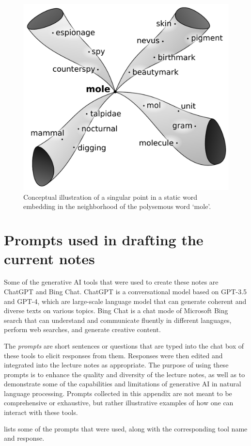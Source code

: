 \documentclass[11pt, a4paper]{amsart}
\newcommand{\generatedtext}[1]{\colorbox{light-gray}{{#1}}} %
\begin{document}
\begin{figure}
	\centering
	\includegraphics[width=0.35\linewidth]{figures/topological_data_analysis/TPS_paper_screenshot}
	\caption{
		Conceptual illustration of a singular point in a static word embedding in the neighborhood of the polysemous word `mole'.
		\label{fig:TPS_paper_screenshot}
	}
\end{figure}


\newpage
\printbibliography


\newpage
\appendix


\section{Prompts used in drafting the current notes}
\label{appendix:prompts}

Some of the generative AI tools that were used to create these notes are ChatGPT and Bing Chat.
ChatGPT is a conversational model based on GPT-3.5 and GPT-4, which are large-scale language model that can generate coherent and diverse texts on various topics.
Bing Chat is a chat mode of Microsoft Bing search that can understand and communicate fluently in different languages, perform web searches, and generate creative content.

The \emph{prompts} are short sentences or questions that are typed into the chat box of these tools to elicit responses from them. 
Responses were then edited and integrated into the lecture notes as appropriate. 
The purpose of using these prompts is to enhance the quality and diversity of the lecture notes, as well as to demonstrate some of the capabilities and limitations of generative AI in natural language processing.
Prompts collected in this appendix are not meant to be comprehensive or exhaustive, but rather illustrative examples of how one can interact with these tools.

 lists some of the prompts that were used, along with the corresponding tool name and response.
\end{document}

